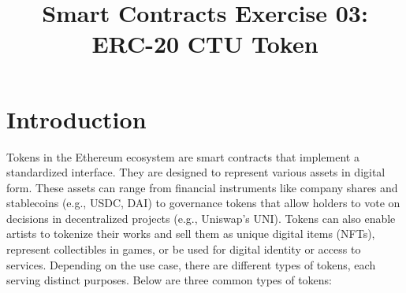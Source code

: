 \documentclass[12pt]{article}
\title{Smart Contracts Exercise 03: \\ ERC-20 CTU Token}
\author{}
\date{}
\begin{document}
\maketitle
\section{Introduction}

Tokens in the Ethereum ecosystem are smart contracts that implement a standardized interface. They are designed to represent various assets in digital form. These assets can range from financial instruments like company shares and stablecoins (e.g., USDC, DAI) to governance tokens that allow holders to vote on decisions in decentralized projects (e.g., Uniswap's UNI). Tokens can also enable artists to tokenize their works and sell them as unique digital items (NFTs), represent collectibles in games, or be used for digital identity or access to services. Depending on the use case, there are different types of tokens, each serving distinct purposes. Below are three common types of tokens:
\end{document}
